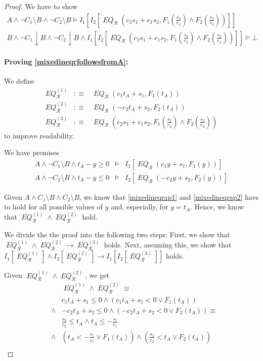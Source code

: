 \documentclass[a4paper]{article}
\theoremstyle{definition}
\newcommand\restrictB{\downarrow B}
\newcommand\withoutB{\setminus B}
\newcommand\defas{:\equiv}
\newcommand\mR{\mathcal{R}}
\newcommand\meq{\mathop{\mathit{EQ}}\nolimits}
\newcommand\meqr{\meq_\mR}
\newcommand\meqrone{\meq_\mR^{(1)}}
\newcommand\meqrtwo{\meq_\mR^{(2)}}
\newcommand\meqrthree{\meq_\mR^{(3)}}
\begin{document}
\begin{proof}
  We have to show
  \begin{eqnarray}
    A\wedge\neg C_1\withoutB\wedge\neg C_2\withoutB\models I_1[I_2[\meqr(c_2s_1+c_1s_2,F_1(\frac{s_2}{c_2})\wedge F_2(\frac{s_2}{c_2}))]]&&\label{mixedineqrfollowsfromA}\\
    B\wedge\neg C_1\restrictB\wedge\neg C_2\restrictB\wedge I_1[I_2[\meqr(c_2s_1+c_1s_2,F_1(\frac{s_2}{c_2})\wedge F_2(\frac{s_2}{c_2}))]]\models\bot&&\label{mixedineqrinconsistentwithB}
  \end{eqnarray}

  \paragraph{Proving \ref{mixedineqrfollowsfromA}:}
  We define 
  \begin{eqnarray*}
    \meqrone&\defas&\meqr(c_1t_A+s_1,F_1(t_A))\\
    \meqrtwo&\defas&\meqr(-c_2t_A+s_2,F_2(t_A))\\
    \meqrthree&\defas&\meqr(c_2s_1+c_1s_2,F_1(\frac{s_2}{c_2})\wedge F_2(\frac{s_2}{c_2}))
    \end{eqnarray*}
  to improve readability.

  We have premises
  \begin{eqnarray}
    A\wedge\neg C_1\withoutB\wedge t_A-y\ge0&\models&I_1[\meqr(c_1y+s_1,F_1(y))]\label{mixedineqrap1}\\
    A\wedge\neg C_2\withoutB\wedge t_A-y\le0&\models&I_2[\meqr(-c_2y+s_2,F_2(y))]\label{mixedineqrap2}
  \end{eqnarray}
  
  Given $A\wedge C_1\withoutB\wedge C_2\withoutB$, we know that \ref{mixedineqrap1} and \ref{mixedineqrap2} have to hold for all possible values of $y$ and, especially, for $y=t_A$.
  Hence, we know that $\meqrone\wedge\meqrtwo$ hold.

  We divide the the proof into the following two steps:
  First, we show that $\meqrone\wedge\meqrtwo\rightarrow\meqrthree$ holds.
  Next, assuming this, we show that $I_1[\meqrone]\wedge I_2[\meqrtwo]\rightarrow I_1[I_2[\meqrthree]]$ holds.

  Given $\meqrone\wedge\meqrtwo$, we get
  \begin{eqnarray*}
    &&\meqrone\wedge\meqrtwo\equiv\\
    &&c_1t_A+s_1\le0\wedge(c_1t_A+s_1<0\vee F_1(t_A))\\
    &\wedge&-c_2t_A+s_2\le0\wedge(-c_2t_A+s_2<0\vee F_2(t_A))\equiv\\
    &&\frac{s_2}{c_2}\le t_A\wedge t_A\le-\frac{s_1}{c_1}\\
    &\wedge&(t_A<-\frac{s_1}{c_1}\vee F_1(t_A))\wedge(\frac{s_2}{c_2}<t_A\vee F_2(t_A))\\
  \end{eqnarray*}


\end{proof}
\end{document}
